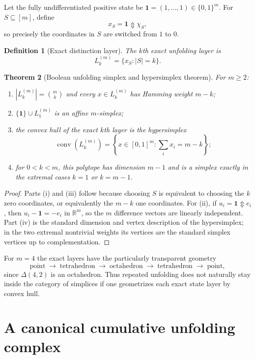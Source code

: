 \documentclass[11pt]{article}
\newtheorem{theorem}{Theorem}[section]
\newtheorem{definition}[theorem]{Definition}
\newcommand{\Updown}{\mathbin{\Updownarrow}}
\begin{document}
Let the fully undifferentiated positive state be $\mathbf 1=(1,\dots,1)\in\{0,1\}^m$.  For $S\subseteq[m]$, define
\[
x_S=\mathbf 1\Updown \chi_S,
\]
so precisely the coordinates in $S$ are switched from $1$ to $0$.

\begin{definition}[Exact distinction layer]
The $k$th exact unfolding layer is
\[
L_k^{(m)}=\{x_S:|S|=k\}.
\]
\end{definition}

\begin{theorem}[Boolean unfolding simplex and hypersimplex theorem]\label{thm:hypersimplex}
For $m\ge2$:
\begin{enumerate}[label=(\roman*)]
\item $|L_k^{(m)}|=\binom{m}{k}$ and every $x\in L_k^{(m)}$ has Hamming weight $m-k$;
\item $\{\mathbf1\}\cup L_1^{(m)}$ is an affine $m$-simplex;
\item the convex hull of the exact $k$th layer is the hypersimplex
\[
\operatorname{conv}(L_k^{(m)})
=\left\{x\in[0,1]^m:\sum_i x_i=m-k\right\};
\]
\item for $0<k<m$, this polytope has dimension $m-1$ and is a simplex exactly in the extremal cases $k=1$ or $k=m-1$.
\end{enumerate}
\end{theorem}
\begin{proof}
Parts (i) and (iii) follow because choosing $S$ is equivalent to choosing the $k$ zero coordinates, or equivalently the $m-k$ one coordinates.  For (ii), if $u_i=\mathbf1\Updown e_i$, then $u_i-\mathbf1=-e_i$ in $\mathbb R^m$, so the $m$ difference vectors are linearly independent.  Part (iv) is the standard dimension and vertex description of the hypersimplex; in the two extremal nontrivial weights its vertices are the standard simplex vertices up to complementation.
\end{proof}

For $m=4$ the exact layers have the particularly transparent geometry
\[
\text{point}\;\longrightarrow\;\text{tetrahedron}\;\longrightarrow\;\text{octahedron}\;\longrightarrow\;\text{tetrahedron}\;\longrightarrow\;\text{point},
\]
since $\Delta(4,2)$ is an octahedron.  Thus repeated unfolding does not naturally stay inside the category of simplices if one geometrizes each exact state layer by convex hull.

\section{A canonical cumulative unfolding complex}
\end{document}
